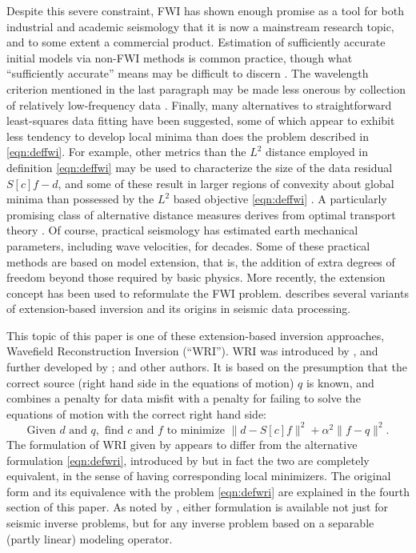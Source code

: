 Despite this severe constraint, FWI has shown enough promise as a tool
for both industrial and academic seismology that it is now a
mainstream research topic, and to some extent a commercial
product. Estimation of sufficiently accurate initial models via
non-FWI methods is common practice, though what ``sufficiently
accurate'' means may be difficult to discern
\cite[]{Plessix:10}. The wavelength criterion mentioned in the last
paragraph may be made less onerous by collection of relatively
low-frequency data \cite[]{Wolfspar:16}. Finally, many alternatives to
straightforward least-squares data fitting have been suggested, some
of which appear to exhibit less tendency to develop local minima than
does the problem described in \ref{eqn:deffwi}. For example, other
metrics than the $L^2$ distance employed in definition
\ref{eqn:deffwi} may be used to characterize the size
of the data residual $S[c]f-d$, and some of these result in larger
regions of convexity about global minima than possessed by the $L^2$ based
objective \ref{eqn:deffwi} . A particularly promising class of
alternative distance measures derives from optimal transport theory
\cite[]{EngquistYang:GEO18,Metivier:GEO18}. Of course, practical
seismology has estimated earth mechanical parameters, including wave
velocities, for decades. Some of these practical methods are based on
model extension, that is, the addition of extra degrees of freedom
beyond those required by basic physics. More recently, the extension
concept has been used to reformulate the FWI
problem. \cite{geoprosp:2008} describes several variants of
extension-based inversion and its origins in seismic data processing.

This topic of this paper is one of these extension-based inversion approaches,
Wavefield Reconstruction Inversion (``WRI''). WRI was introduced by \cite{LeeuwenHerrmannWRI:13}, and further
developed by \cite{LeeuwenHerrmann:16,WangYingst:SEG16,Lietal:18, Leeuwen2019note,Herrmann:SEG19,Aghamiry:19,FangWangHerrmann:20,Aghmiryetal:20,Louboutinetal:20}; and other
authors. It is based on the presumption that the correct source (right
hand side in the equations of motion) $q$ is
known, and combines a penalty for data misfit with a penalty for
failing to solve the equations of motion with the correct right hand side:
\begin{equation}
  \label{eqn:defwri}
  \mbox{Given } d \mbox{ and }q, \mbox{ find }c \mbox{ and }f \mbox{ to
    minimize }
  \|d -  S[c]f\|^2+\alpha^2\|f-q\|^2.
\end{equation}
The formulation of WRI given by \cite{LeeuwenHerrmannWRI:13}
appears to differ from the alternative formulation \ref{eqn:defwri},
introduced by \cite{WangYingst:SEG16} but in fact the two are
completely equivalent, in the sense of having corresponding local
minimizers. The original form and its equivalence with the problem
\ref{eqn:defwri} are explained in the fourth section of this paper. As
noted by \cite{Leeuwen2019note}, either formulation is available not
just for seismic inverse problems, but for any inverse problem based
on a separable (partly linear) modeling operator.

